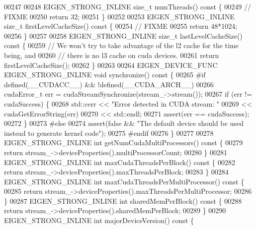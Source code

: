\begin{DoxyCode}
00247 
00248   EIGEN\_STRONG\_INLINE \textcolor{keywordtype}{size\_t} numThreads()\textcolor{keyword}{ const }\{
00249     \textcolor{comment}{// FIXME}
00250     \textcolor{keywordflow}{return} 32;
00251   \}
00252 
00253   EIGEN\_STRONG\_INLINE \textcolor{keywordtype}{size\_t} firstLevelCacheSize()\textcolor{keyword}{ const }\{
00254     \textcolor{comment}{// FIXME}
00255     \textcolor{keywordflow}{return} 48*1024;
00256   \}
00257 
00258   EIGEN\_STRONG\_INLINE \textcolor{keywordtype}{size\_t} lastLevelCacheSize()\textcolor{keyword}{ const }\{
00259     \textcolor{comment}{// We won't try to take advantage of the l2 cache for the time being, and}
00260     \textcolor{comment}{// there is no l3 cache on cuda devices.}
00261     \textcolor{keywordflow}{return} firstLevelCacheSize();
00262   \}
00263 
00264   EIGEN\_DEVICE\_FUNC EIGEN\_STRONG\_INLINE \textcolor{keywordtype}{void} synchronize()\textcolor{keyword}{ const }\{
00265 \textcolor{preprocessor}{#if defined(\_\_CUDACC\_\_) && !defined(\_\_CUDA\_ARCH\_\_)}
00266     cudaError\_t err = cudaStreamSynchronize(stream\_->stream());
00267     \textcolor{keywordflow}{if} (err != cudaSuccess) \{
00268       std::cerr << \textcolor{stringliteral}{"Error detected in CUDA stream: "}
00269                 << cudaGetErrorString(err)
00270                 << std::endl;
00271       assert(err == cudaSuccess);
00272     \}
00273 \textcolor{preprocessor}{#else}
00274     assert(\textcolor{keyword}{false} && \textcolor{stringliteral}{"The default device should be used instead to generate kernel code"});
00275 \textcolor{preprocessor}{#endif}
00276   \}
00277 
00278   EIGEN\_STRONG\_INLINE \textcolor{keywordtype}{int} getNumCudaMultiProcessors()\textcolor{keyword}{ const }\{
00279     \textcolor{keywordflow}{return} stream\_->deviceProperties().multiProcessorCount;
00280   \}
00281   EIGEN\_STRONG\_INLINE \textcolor{keywordtype}{int} maxCudaThreadsPerBlock()\textcolor{keyword}{ const }\{
00282     \textcolor{keywordflow}{return} stream\_->deviceProperties().maxThreadsPerBlock;
00283   \}
00284   EIGEN\_STRONG\_INLINE \textcolor{keywordtype}{int} maxCudaThreadsPerMultiProcessor()\textcolor{keyword}{ const }\{
00285     \textcolor{keywordflow}{return} stream\_->deviceProperties().maxThreadsPerMultiProcessor;
00286   \}
00287   EIGEN\_STRONG\_INLINE \textcolor{keywordtype}{int} sharedMemPerBlock()\textcolor{keyword}{ const }\{
00288     \textcolor{keywordflow}{return} stream\_->deviceProperties().sharedMemPerBlock;
00289   \}
00290   EIGEN\_STRONG\_INLINE \textcolor{keywordtype}{int} majorDeviceVersion()\textcolor{keyword}{ const }\{

\end{DoxyCode}
